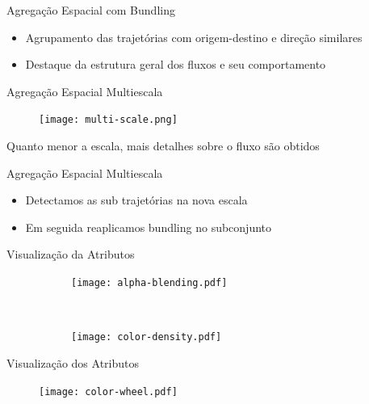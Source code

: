 \begin{frame}{Agregação Espacial com Bundling}
  \begin{itemize}
    \item Agrupamento das trajetórias com origem-destino e direção similares
    \item Destaque da estrutura geral dos fluxos e seu comportamento
  \end{itemize}
\end{frame}


\begin{frame}{Agregação Espacial Multiescala}
	\begin{figure}[!htb]
		\centering
		\texttt{[image: multi-scale.png]}
	\end{figure}
	\centering
  Quanto menor a escala, mais detalhes sobre o fluxo são obtidos
\end{frame}

\begin{frame}{Agregação Espacial Multiescala}
  \begin{itemize}
    \item Detectamos as sub trajetórias na nova escala
    \item Em seguida reaplicamos bundling no subconjunto
  \end{itemize}
\end{frame}

\begin{frame}{Visualização da Atributos}
	\begin{figure}[ht!]
		\centering
		\begin{subfigure}[t]{\textwidth}
			\centering
			\texttt{[image: alpha-blending.pdf]}
		\end{subfigure}
		~
		\begin{subfigure}[t]{\textwidth}
			\centering
			\texttt{[image: color-density.pdf]}
		\end{subfigure}
	\end{figure}
\end{frame}

\begin{frame}{Visualização dos Atributos}
	\begin{figure}[ht!]
		\centering
		\texttt{[image: color-wheel.pdf]}
	\end{figure}
\end{frame}

